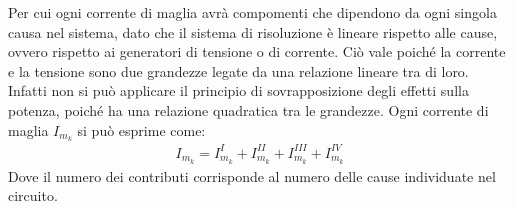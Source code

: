 \documentclass{article}
\numberwithin{equation}{subsection}
\begin{document}
Per cui ogni corrente di maglia avrà compomenti che dipendono da ogni singola causa nel sistema, dato che il sistema di risoluzione è lineare rispetto alle cause, ovvero 
rispetto ai generatori di tensione o di corrente. Ciò vale poiché la corrente e la tensione sono due grandezze legate da una relazione lineare tra di loro. Infatti non si può 
applicare il principio di sovrapposizione degli effetti sulla potenza, poiché ha una relazione quadratica tra le grandezze. Ogni corrente di maglia $I_{m_k}$ si può esprime come:
\begin{gather*}
    I_{m_k}=I_{m_k}^{I}+I_{m_k}^{II}+I_{m_k}^{III}+I_{m_k}^{IV}
\end{gather*}
Dove il numero dei contributi corrisponde al numero delle cause individuate nel circuito. 
\end{document}
